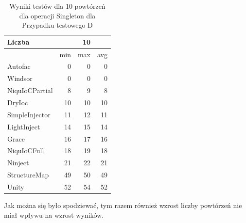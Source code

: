 \documentclass[12pt]{article}
\begin{document}
\begin{table}[H]
\captionsetup{belowskip=0pt,aboveskip=0pt}
\begin{center}
\begin{small}
	\begin{tabular}{ | l | r r r | }
    		\hline
Liczba & & 10 & \\ \hline
 & min & max & avg \\ \hline
Autofac & 0 & 0 & 0 \\ \hline
Windsor & 0 & 0 & 0 \\ \hline
NiquIoCPartial & 8 & 9 & 8 \\ \hline
DryIoc & 10 & 10 & 10 \\ \hline
SimpleInjector & 11 & 12 & 11 \\ \hline
LightInject & 14 & 15 & 14 \\ \hline
Grace & 16 & 17 & 16 \\ \hline
NiquIoCFull & 18 & 19 & 18 \\ \hline
Ninject & 21 & 22 & 21 \\ \hline
StructureMap & 49 & 50 & 49 \\ \hline
Unity & 52 & 54 & 52 \\ \hline
  	\end{tabular}
\end{small}
\end{center}
\caption{Wyniki testów dla 10 powtórzeń dla operacji Singleton dla Przypadku testowego D}
\label{TestCaseD_Singleton10}
\end{table}
Jak można się było spodziewać, tym razem również wzrost liczby powtórzeń nie miał wpływu na wzrost wyników.
\end{document}
